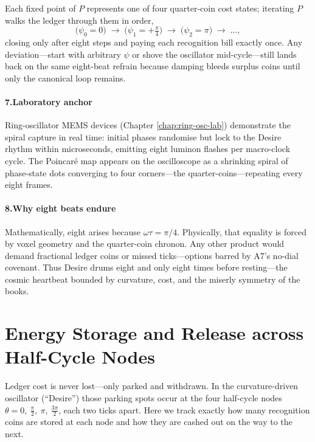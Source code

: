 \documentclass[11pt,oneside]{book}
\begin{document}
Each fixed point of $P$ represents one of four quarter-coin cost
states; iterating $P$ walks the ledger through them in order,
\[
\bigl(\psi_{0}=0\bigr)
\;\to\;
\bigl(\psi_{1}=+\tfrac{\pi}{4}\bigr)
\;\to\;
\bigl(\psi_{2}=\pi\bigr)
\;\to\;\dots,
\]
closing only after eight steps and paying each recognition bill exactly
once.  Any deviation—start with arbitrary $\psi$ or shove the oscillator
mid-cycle—still lands back on the same eight-beat refrain because
damping bleeds surplus coins until only the canonical loop remains.

\paragraph*{7.\quad Laboratory anchor}

Ring-oscillator MEMS devices (Chapter \ref{chap:ring-osc-lab})
demonstrate the spiral capture in real time: initial phases randomise
but lock to the Desire rhythm within microseconds, emitting eight
luminon flashes per macro-clock cycle.  The Poincaré map appears on the
oscilloscope as a shrinking spiral of phase-state dots converging to
four corners—the quarter-coins—repeating every eight frames.

\paragraph*{8.\quad Why eight beats endure}

Mathematically, eight arises because $\omega\tau=\pi/4$.  
Physically, that equality is forced by voxel geometry and the
quarter-coin chronon.  Any other product would demand fractional ledger
coins or missed ticks—options barred by A7’s no-dial covenant.  
Thus Desire drums eight and only eight times before resting—the cosmic
heartbeat bounded by curvature, cost, and the miserly symmetry of the
books.

\section{Energy Storage and Release across Half-Cycle Nodes}
\label{sec:energy-halfcycle}

Ledger cost is never lost—only parked and withdrawn.  
In the curvature-driven oscillator (“Desire”) those parking spots occur at the four half-cycle nodes $\theta = 0,\ \tfrac{\pi}{2},\ \pi,\ \tfrac{3\pi}{2}$, each two ticks apart.  
Here we track exactly how many recognition coins are stored at each node and how they are cashed out on the way to the next.
\end{document}
